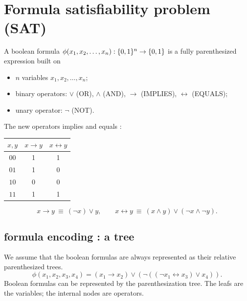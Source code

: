 \section{Formula satisfiability problem (SAT)}
\begin{notesdefinition}
A boolean formula $\phi(x_1,x_2,\ldots,x_n):\{0,1\}^n\to\{0,1\}$ is a fully parenthesized expression built on
\begin{itemize}
\item $n$ variables $x_1,x_2,\ldots,x_n$;
\item binary operators: $\lor$ (OR), $\land$ (AND), $\to$ (IMPLIES), $\leftrightarrow$ (EQUALS);
\item unary operator: $\neg$ (NOT).
\end{itemize}
\end{notesdefinition}

The new operators implies and equals : 
\begin{center}
\begin{tabular}{c|cc}
$x,y$ & $x\to y$ & $x\leftrightarrow y$\\\hline
$00$ & 1 & 1\\
$01$ & 1 & 0\\
$10$ & 0 & 0\\
$11$ & 1 & 1
\end{tabular}
\end{center}
\[
x\to y\ \equiv\ (\neg x)\lor y,\qquad
x\leftrightarrow y\ \equiv\ (x\land y)\lor(\neg x\land\neg y).
\]
\subsection{formula encoding : a tree}
We assume that the boolean formulas are always represented as their relative parenthesized trees. 
\[
\phi(x_1,x_2,x_3,x_4)=(x_1\to x_2)\lor(\neg((\neg x_1\leftrightarrow x_3)\lor x_4)).
\]
Boolean formulas can be represented by the parenthesization tree. The leafs are the  variables; the internal nodes are operators.
